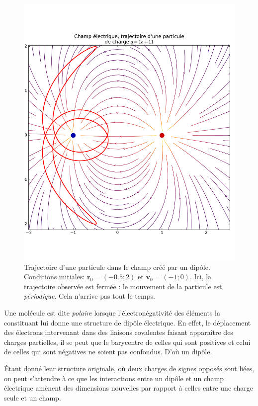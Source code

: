 \documentclass{article}
\renewcommand{\vec}[1]{\boldsymbol{\mathbf{#1}}}
\theoremstyle{definition}
\theoremstyle{remark}
\begin{document}
\begin{figure}[h]
	\centering
	\includegraphics[height=0.6\textheight]{parts/electrostat/traj_x0(-05,2)_v0(-1,0).pdf}
	\caption{Trajectoire d'une particule dans le champ créé par un dipôle. Conditions initiales: $\vec{r}_0 = (\num{-0.5};2)$ et $\vec{v}_0=(-1;0)$. Ici, la trajectoire observée est fermée : le mouvement de la particule est \textit{périodique}. Cela n'arrive pas tout le temps.}
\end{figure}

Une molécule est dite \textit{polaire} lorsque l'électronégativité des éléments la constituant lui donne une structure de dipôle électrique. En effet, le déplacement des électrons intervenant dans des liaisons covalentes faisant apparaître des charges partielles, il se peut que le barycentre de celles qui sont positives et celui de celles qui sont négatives ne soient pas confondus. D'où un dipôle.


Étant donné leur structure originale, où deux charges de signes opposés sont liées, on peut s'attendre à ce que les interactions entre un dipôle et un champ électrique amènent des dimensions nouvelles par rapport à celles entre une charge seule et un champ.
\end{document}
